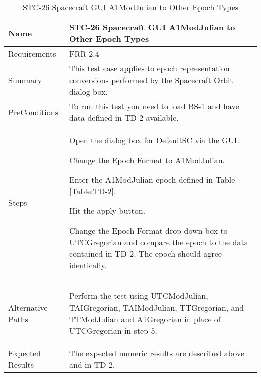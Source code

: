 \begin{table}[htbp!]
\centering
      \begin{tabular}{|p{1.05 in} |p{4.75 in} |}
      \hline
         \rowcolor[rgb]{0.8,0.8,0.8} Name & STC-26 Spacecraft GUI A1ModJulian to Other Epoch Types\\
         \hline
         Requirements & FRR-2.4\\ \hline
         Summary &
         This test case applies to epoch representation conversions performed by the Spacecraft Orbit dialog box.  \\
         \hline
         PreConditions & To run this test you need to load BS-1 and have data defined in TD-2 available.\\
         \hline
         Steps &
         \begin{compactenum}
         \item Open the dialog box for DefaultSC via the GUI.
         \item Change the Epoch Format to A1ModJulian.
         \item Enter the A1ModJulian epoch defined in Table \ref{Table:TD-2}.
         \item Hit the apply button.
         \item Change the Epoch Format drop down box to UTCGregorian and compare the epoch to the
          data contained in TD-2. The epoch should agree identically.
         \end{compactenum}\\
		 \hline
         Alternative Paths &
         \begin{compactenum}
         \item Perform the test using UTCModJulian, TAIGregorian, TAIModJulian, TTGregorian, and TTModJulian
         and A1Gregorian in place of UTCGregorian in step 5.
         \end{compactenum}\\
         \hline
         Expected Results & The expected numeric results are described above and in TD-2.\\
      \hline
\end{tabular}
      \label{Table:STC-26}
      \caption{STC-26 Spacecraft GUI A1ModJulian to Other Epoch Types}
\end{table} 